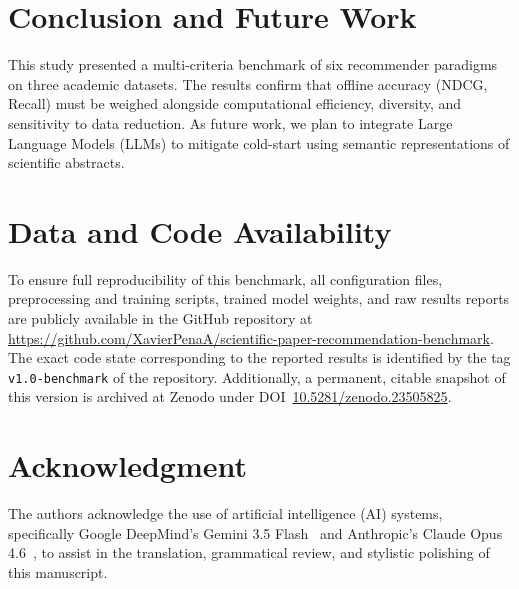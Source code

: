 \documentclass[journal]{IEEEtran}
\begin{document}
\section{Conclusion and Future Work}
\label{sec:conclusion}
This study presented a multi-criteria benchmark of six recommender paradigms on three academic datasets. The results confirm that offline accuracy (NDCG, Recall) must be weighed alongside computational efficiency, diversity, and sensitivity to data reduction. As future work, we plan to integrate Large Language Models (LLMs) to mitigate cold-start using semantic representations of scientific abstracts.

\section*{Data and Code Availability}
To ensure full reproducibility of this benchmark, all configuration files, preprocessing and training scripts, trained model weights, and raw results reports are publicly available in the GitHub repository at \url{https://github.com/XavierPenaA/scientific-paper-recommendation-benchmark}. The exact code state corresponding to the reported results is identified by the tag \texttt{v1.0-benchmark} of the repository. Additionally, a permanent, citable snapshot of this version is archived at Zenodo under DOI~\href{https://doi.org/10.5281/zenodo.23505825}{10.5281/zenodo.23505825}.

\section*{Acknowledgment}
The authors acknowledge the use of artificial intelligence (AI) systems, specifically Google DeepMind's Gemini 3.5 Flash~\cite{gemini2026} and Anthropic's Claude Opus 4.6~\cite{claude2026}, to assist in the translation, grammatical review, and stylistic polishing of this manuscript.



\end{document}
